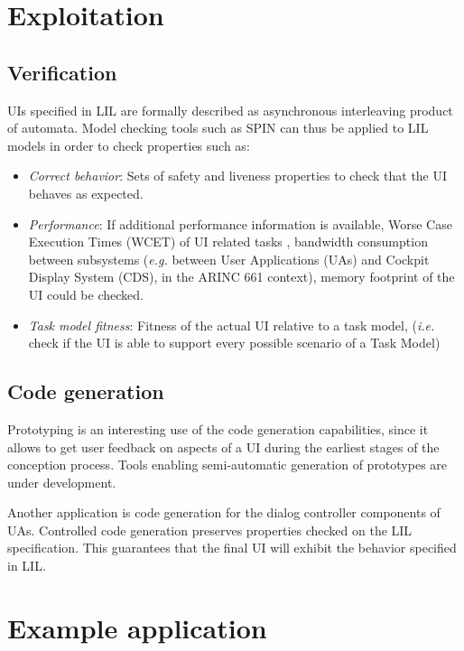 \documentclass{sigchi}
\begin{document}
\section{Exploitation}

\subsection{Verification}
UIs specified in LIL are formally described as asynchronous interleaving product of automata. Model checking tools such as SPIN \cite{Holzmann:1997:MCS:260897.260902} can thus be applied to LIL models in order to check properties such as:
\begin{itemize}
\item \textit{Correct behavior}: Sets of safety and liveness properties to check that the UI behaves as expected.
\item \textit{Performance}: If additional performance information is available, Worse Case Execution Times (WCET) of UI related tasks
, bandwidth consumption between subsystems (\textit{e.g.} between User Applications (UAs) and Cockpit Display System (CDS), in the ARINC 661 context), memory footprint of the UI could be checked.
\item \textit{Task model fitness}: Fitness of the actual UI relative to a task model, (\textit{i.e.} check if the UI is able to support every possible scenario of a Task Model)
\end{itemize}

\subsection{Code generation}
Prototyping is an interesting use of the code generation capabilities, since it allows to get user feedback on aspects of a UI during the earliest stages of the conception process. Tools enabling semi-automatic generation of prototypes are under development.

Another application is code generation for the dialog controller components\cite{Bass91} of UAs. Controlled code generation preserves properties checked on the LIL specification. This guarantees that the final UI will exhibit the behavior specified in LIL.

\section{Example application}
\end{document}
